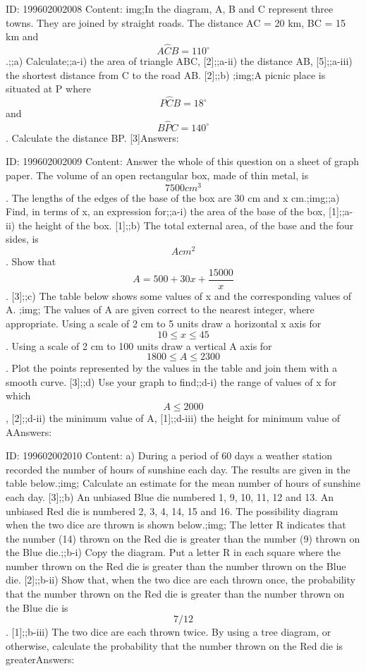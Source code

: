 \documentclass{article}
\begin{document}
ID: 199602002008
Content:
img;In the diagram, A, B and C represent three towns. They are joined by straight roads. The distance AC = 20 km, BC = 15 km and $$A \hat CB = 110^{\circ}$$.;;a) Calculate;;a-i) the area of triangle ABC, [2];;a-ii) the distance AB, [5];;a-iii) the shortest distance from C to the road AB. [2];;b) ;img;A picnic place is situated at P where $$P \hat CB = 18^{\circ}$$ and $$B \hat PC = 140^{\circ}$$. Calculate the distance BP. [3]Answers:

ID: 199602002009
Content:
Answer the whole of this question on a sheet of graph paper. The volume of an open rectangular box, made of thin metal, is $$7500cm^3$$. The lengths of the edges of the base of the box are 30 cm and x cm.;img;;a) Find, in terms of x, an expression for;;a-i) the area of the base of the box, [1];;a-ii) the height of the box. [1];;b) The total external area, of the base and the four sides, is $$Acm^2$$. Show that $$A = 500 + 30x + \frac{15000}{x}$$. [3];;c) The table below shows some values of x and the corresponding values of A. ;img; The values of A are given correct to the nearest integer, where appropriate. Using a scale of 2 cm to 5 units draw a horizontal x axis for $$10 \leq x \leq 45$$. Using a scale of 2 cm to 100 units draw a vertical A axis for $$1800 \leq A \leq 2300$$. Plot the points represented by the values in the table and join them with a smooth curve. [3];;d) Use your graph to find;;d-i) the range of values of x for which $$A\leq 2000$$, [2];;d-ii) the minimum value of A, [1];;d-iii) the height for minimum value of AAnswers:

ID: 199602002010
Content:
a) During a period of 60 days a weather station recorded the number of hours of sunshine each day. The results are given in the table below.;img; Calculate an estimate for the mean number of hours of sunshine each day. [3];;b) An unbiased Blue die numbered 1, 9, 10, 11, 12 and 13. An unbiased Red die is numbered 2, 3, 4, 14, 15 and 16. The possibility diagram when the two dice are thrown is shown below.;img; The letter R indicates that the number (14) thrown on the Red die is greater than the number (9) thrown on the Blue die.;;b-i) Copy the diagram. Put a letter R in each square where the number thrown on the Red die is greater than the number thrown on the Blue die. [2];;b-ii) Show that, when the two dice are each thrown once, the probability that the number thrown on the Red die is greater than the number thrown on the Blue die is $$7/12$$. [1];;b-iii) The two dice are each thrown twice. By using a tree diagram, or otherwise, calculate the probability that the number thrown on the Red die is greaterAnswers:
\end{document}

